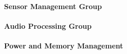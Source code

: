 \paragraph{Sensor Management Group}

\paragraph{Audio Processing Group}

\paragraph{Power and Memory Management}

% 
% 

